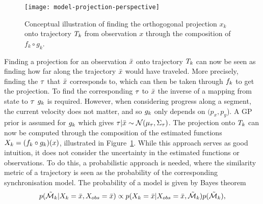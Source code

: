 \begin{figure}
  \centering
  \texttt{[image: model-projection-perspective]}
  \caption{Conceptual illustration of finding the orthogogonal
    projection $x_k$ onto trajectory $T_k$ from observation $x$
    through the composition of $f_k \circ g_k$.}\label{fig:model-projection-concept}
\end{figure}
Finding a projection for an observation $\bar{x}$ onto trajectory
$T_{k}$ can now be seen as finding how far along the trajectory $\bar{x}$
would have traveled. More precisely, finding the $\tau$ that $\bar{x}$
corresponds to, which can then be taken through $f_{k}$
to get the projection.
To find the corresponding $\tau$ to $\bar{x}$ the inverse of
a mapping from state to $\tau$ $g_{k}$ is required. However, when considering progress along a segment,
the current velocity does not matter, and so $g_{k}$ only depends on $(p_x, p_y$).
A GP prior is assumed for $g_{k}$ which gives 
$\tau \vert \bar{x} \sim \mathcal{N}(\mu_{\tau}, \Sigma_{\tau})$.
The projection onto $T_{k}$ can now be computed through the composition 
of the estimated functions $X_{k} = (f_{k} \circ g_{k})(x)$, 
illustrated in Figure~\ref{fig:model-projection-concept}. 
While this approach serves as good intuition, it does not consider the uncertainty in
the estimated functions or observations. To do this, a probabilistic approach is needed, where the
similarity metric of a trajectory is seen as the probability of the corresponding
synchronisation model. The probability of a model is given by Bayes theorem
\begin{equation}
  \label{eq:model-posterior-probability}
  p(\tilde{\mathcal{M}}_{k} \vert X_{k} = \bar{x}, X_{obs} = \bar{x}) \propto
  p(X_{k} = \bar{x} \vert X_{obs} = \bar{x}, \tilde{\mathcal{M}}_{k})
  p(\tilde{\mathcal{M}}_{k}),
\end{equation}
